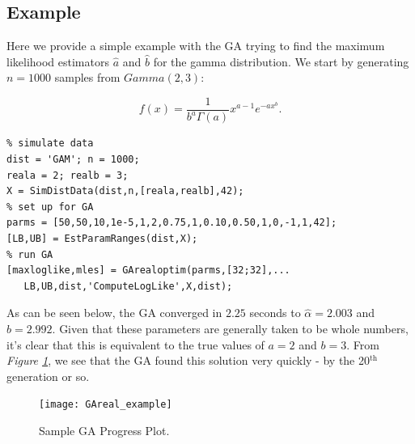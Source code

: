 \documentclass{book}
\begin{document}
\subsection*{Example}

Here we provide a simple example with the GA trying to find the maximum
likelihood estimators $\hat{a}$ and $\hat{b}$ for the gamma distribution. We
start by generating $n=1000$ samples from $Gamma\left( 2,3\right) $:

\begin{equation}
f\left( x\right) =\frac{1}{b^{a}\Gamma \left( a\right) }x^{a-1}e^{-ax^{b}}%
\text{.}  \label{eqn_gamma}
\end{equation}
\begin{verbatim}
% simulate data
dist = 'GAM'; n = 1000;
reala = 2; realb = 3;
X = SimDistData(dist,n,[reala,realb],42);
% set up for GA
parms = [50,50,10,1e-5,1,2,0.75,1,0.10,0.50,1,0,-1,1,42];
[LB,UB] = EstParamRanges(dist,X);
% run GA
[maxloglike,mles] = GArealoptim(parms,[32;32],...
   LB,UB,dist,'ComputeLogLike',X,dist);
\end{verbatim}
As can be seen below, the GA converged in $2.25$ seconds to $\hat{\alpha}%
=2.003$ and $\hat{b}=2.992$. Given that these parameters are generally taken
to be whole numbers, it's clear that this is equivalent to the true values
of $a=2$ and $b=3$. From \emph{Figure \ref{fig_realGAex}}, we see that the
GA found this solution very quickly - by the 20$^{\text{th}}$ generation or
so.
\begin{figure}[htbp]
\begin{center}
\texttt{[image: GAreal\_example]}
\end{center}
\caption{Sample GA Progress Plot.}
\label{fig_realGAex}
\end{figure}
\end{document}
